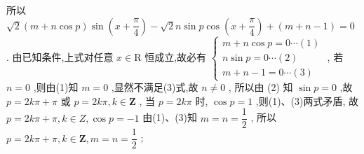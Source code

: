 \begin{enumerate}
\begin{jieda}
\begin{enumerate}
        所以 $ \sqrt{2}\left( {m + n\cos p}\right) \sin \left( {x + \dfrac{\pi }{4}}\right)  - \sqrt{2}n\sin p\cos \left( {x + \dfrac{\pi }{4}}\right)  + \left( {m + n - 1}\right)  = 0 $ .
        由已知条件,上式对任意 $ x \in  \mathrm{R} $ 恒成立,故必有 $ \left\{  \begin{array}{l} m + n\cos p = 0\cdots \left( 1\right) \\  n\sin p = 0\cdots \left( 2\right) \\  m + n - 1 = 0\cdots \left( 3\right)  \end{array}\right. $ ,
        若 $ n = 0 $ ,则由(1)知 $ m = 0 $ ,显然不满足(3)式,故 $ n \neq  0 $ ,
        所以由 (2) 知 $ \sin p = 0 $ ,故 $ p = {2k\pi } + \pi $ 或 $ p = {2k\pi },k \in  \mathbf{Z} $ ,
        当 $ p = {2k\pi } $ 时, $ \cos p = 1 $ ,则(1)、(3)两式矛盾,
        故 $ p = {2k\pi } + \pi ,k \in  Z,\cos p =  - 1 $ 由(1)、(3)知 $ m = n = \dfrac{1}{2} $ ,
        所以 $ p = {2k\pi } + \pi ,k \in  \mathbf{Z},m = n = \dfrac{1}{2} $ ;
    \end{enumerate}
\end{jieda}
\end{enumerate}

\clearpage
